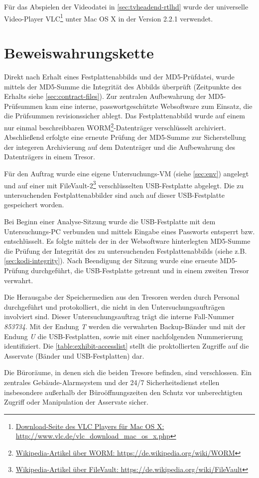 Für das Abspielen der Videodatei in \autoref{sec:tvheadend-rtlhd} wurde der universelle Video-Player VLC\footnote{\href{http://www.vlc.de/vlc\_download\_mac\_os\_x.php}{Download-Seite des VLC Players für Mac OS X: http://www.vlc.de/vlc\_download\_mac\_os\_x.php}} unter Mac OS X in der Version 2.2.1 verwendet.

\section{Beweiswahrungskette}
\label{sec:cod}

Direkt nach Erhalt eines Festplattenabbilds und der MD5-Prüfdatei, wurde mittels der MD5-Summe die Integrität des Abbilds überprüft (Zeitpunkte des Erhalts siehe \autoref{sec:contract-files}). Zur zentralen Aufbewahrung der MD5-Prüfsummen kam eine interne, passwortgeschützte Websoftware zum Einsatz, die die Prüfsummen revisionssicher ablegt. Das Festplattenabbild wurde auf einem nur einmal beschreibbaren WORM\footnote{\href{https://de.wikipedia.org/wiki/WORM}{Wikipedia-Artikel über WORM: https://de.wikipedia.org/wiki/WORM}}-Datenträger verschlüsselt archiviert. Abschließend erfolgte eine erneute Prüfung der MD5-Summe zur Sicherstellung der integeren Archivierung auf dem Datenträger und die Aufbewahrung des Datenträgers in einem Tresor.

Für den Auftrag wurde eine eigene Untersuchungs-VM (siehe \autoref{sec:env}) angelegt und auf einer mit FileVault-2\footnote{\href{https://de.wikipedia.org/wiki/FileVault}{Wikipedia-Artikel über FileVault: https://de.wikipedia.org/wiki/FileVault}} verschlüsselten USB-Festplatte abgelegt. Die zu untersuchenden Festplattenabbilder sind auch auf dieser USB-Festplatte gespeichert worden.

Bei Beginn einer Analyse-Sitzung wurde die USB-Festplatte mit dem Untersuchungs-PC verbunden und mittels Eingabe eines Passworts entsperrt bzw. entschlüsselt. Es folgte  mittels der in der Websoftware hinterlegten MD5-Summe die Prüfung der Integrität des zu untersuchenden Festplattenabbilds (siehe z.B. \autoref{sec:kodi-integrity}). Nach Beendigung der Sitzung wurde eine erneute MD5-Prüfung durchgeführt, die USB-Festplatte getrennt und in einem zweiten Tresor verwahrt.

Die Herausgabe der Speichermedien aus den Tresoren werden durch Personal durchgeführt und protokolliert, die nicht in den Untersuchungsaufträgen involviert sind. Dieser Untersuchungsauftrag trägt die interne Fall-Nummer \textit{853734}. Mit der Endung \textit{T} werden die verwahrten Backup-Bänder und mit der Endung \textit{U} die USB-Festplatten, sowie mit einer nachfolgenden Nummerierung identifiziert. Die \autoref{table:exhibit-accesslist} stellt die proktollierten Zugriffe auf die Asservate (Bänder und USB-Festplatten) dar.

Die Büroräume, in denen sich die beiden Tresore befinden, sind verschlossen. Ein zentrales Gebäude-Alarmsystem und der 24/7 Sicherheitsdienst stellen insbesondere außerhalb der Büroöffnungszeiten den Schutz vor unberechtigten Zugriff oder Manipulation der Asservate sicher.
